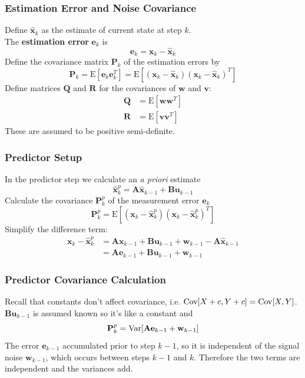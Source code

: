 \documentclass{beamer}
\renewcommand{\vec}[1]{\mathbf{#1}}
\newcommand{\vx}{\vec{x}}
\newcommand{\ve}{\vec{e}}
\newcommand{\vw}{\vec{w}}
\newcommand{\vv}{\vec{v}}
\newcommand{\vu}{\vec{u}}
\newcommand{\vA}{\vec{A}}
\newcommand{\vB}{\vec{B}}
\newcommand{\vP}{\vec{P}}
\newcommand{\vQ}{\vec{Q}}
\newcommand{\vR}{\vec{R}}
\newcommand{\R}{\mathbb{R}}
\newcommand{\vxh}{\hat{\vx}}
\newcommand{\E}{\mathrm{E}}
\newcommand{\var}{\textnormal{Var}}
\newcommand{\cov}{\textnormal{Cov}}
\begin{document}
\begin{frame}
\frametitle{Estimation Error and Noise Covariance}
Define $\vxh_k$ as the estimate of current state at step $k$.\\
The \textbf{estimation error} $\ve_k$ is
\begin{equation}
\label{eq:error}
\ve_k = \vx_k - \vxh_k
\end{equation}
Define the covariance matrix $\vP_k$ of the estimation errors by
\begin{equation}
\label{eq:error_covariance}
\vP_k = \E[ \ve_k \ve_k^T ] = \E[ (\vx_k - \vxh_k) (\vx_k - \vxh_k)^T ]
\end{equation}
Define matrices $\vQ$ and $\vR$ for the covariances of $\vw$ and $\vv$:
\begin{align*}
\vQ &= \E[ \vw \vw^T ] \\
\vR &= \E[ \vv \vv^T ]
\end{align*}
These are assumed to be positive semi-definite.
\end{frame}

\begin{frame}
\frametitle{Predictor Setup}
In the predictor step we calculate an \textit{a priori} estimate
\begin{equation} 
\label{eq:predictor}
\vxh_k^p = \vA \vxh_{k-1} + \vB \vu_{k-1} 
\end{equation}
Calculate the covariance $\vP_k^p$ of the measurement error $\ve_k$  
\begin{equation} 
\vP_k^p = \E[ (\vx_k - \vxh_k^p) (\vx_k - \vxh_k^p)^T] 
\end{equation}
Simplify the difference term:
\begin{align*} 
\vx_k - \vxh_k^p &= \vA \vx_{k-1} + \vB \vu_{k-1} + \vw_{k-1} - \vA \vxh_{k-1} \\
&= \vA \ve_{k-1} + \vB \vu_{k-1} + \vw_{k-1}
\end{align*}
\end{frame}

\begin{frame}
\frametitle{Predictor Covariance Calculation}
Recall that constants don't affect covariance, i.e. $\cov[X+c, Y+c] = \cov[X,Y]$.\\
$\vB \vu_{k-1}$ is assumed known so it's like a constant and
\[ \vP_k^p = \var[\vA \ve_{k-1} + \vw_{k-1}] \]
The error $\ve_{k-1}$ accumulated prior to step $k-1$,
so it is independent of the signal noise $\vw_{k-1}$, which occurs between steps $k-1$ and $k$.
Therefore the two terms are independent and the variances add.
\end{frame}
\end{document}
